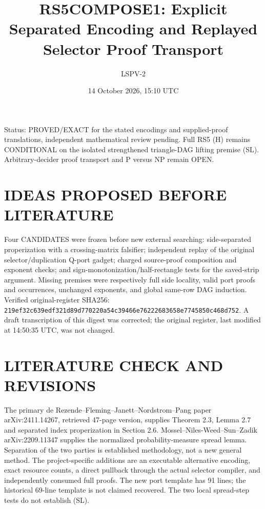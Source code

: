 \documentclass[11pt]{article}
\title{RS5COMPOSE1: Explicit Separated Encoding and Replayed Selector Proof Transport}
\author{LSPV-2}
\date{14 October 2026, 15:10 UTC}
\begin{document}
\maketitle
\noindent Status: PROVED/EXACT for the stated encodings and supplied-proof translations, independent mathematical review pending. Full RS5 (H) remains CONDITIONAL on the isolated strengthened triangle-DAG lifting premise (SL). Arbitrary-decider proof transport and P versus NP remain OPEN.
\section{IDEAS PROPOSED BEFORE LITERATURE}
Four CANDIDATES were frozen before new external searching: side-separated properization with a crossing-matrix falsifier; independent replay of the original selector/duplication Q-port gadget; charged source-proof composition and exponent checks; and sign-monotonization/half-rectangle tests for the saved-strip argument. Missing premises were respectively full side locality, valid port proofs and occurrences, unchanged exponents, and global same-row DAG induction. Verified original-register SHA256: \nolinkurl{219ef32c639edf321d89d770220a54c39466e76222683658e7745850c468d752}. A draft transcription of this digest was corrected; the original register, last modified at 14:50:35 UTC, was not changed.
\section{LITERATURE CHECK AND REVISIONS}
The primary de Rezende--Fleming--Janett--Nordstrom--Pang paper arXiv:2411.14267, retrieved 47-page version, supplies Theorem 2.3, Lemma 2.7 and separated index properization in Section 2.6. Mossel--Niles-Weed--Sun--Zadik arXiv:2209.11347 supplies the normalized probability-measure spread lemma. Separation of the two parties is established methodology, not a new general method. The project-specific additions are an executable alternative encoding, exact resource counts, a direct pullback through the actual selector compiler, and independently consumed full proofs. The new port template has 91 lines; the historical 69-line template is not claimed recovered. The two local spread-step tests do not establish (SL).
\end{document}
